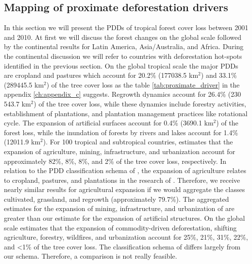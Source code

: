 		\subsection{Mapping of proximate deforestation drivers}
		\label{subsec:results_proxy_deforestation_drivers}
			In this section we will present the \acp{PDD} of tropical forest cover loss between 2001 and 2010. At first we will discuss the forest changes on the global scale followed by the continental results for Latin America, Asia/Australia, and Africa. During the continental discussion we will refer to countries with deforestation hot-spots identified in the previous section. On the global tropical scale the major \acp{PDD} are cropland and pastures which account for 20.2\% (177038.5 km$^2$) and 33.1\% (289445.5 km$^2$) of the tree cover loss as the table \ref{tab:proximate_driver} in the appendix \ref{ch:appendix_c} suggests. Regrowth dynamics account for 26.4\% (230 543.7 km$^2$) of the tree cover loss, while these dynamics include forestry activities, establishment of plantations, and plantation management practices like rotational cycle. The expansion of artificial surfaces account for 0.4\% (3690.1 km$^2$) of the forest loss, while the inundation of forests by rivers and lakes account for 1.4\% (12011.9 km$^2$). For 100 tropical and subtropical countries, \citet{Hosonuma2012} estimates that the expansion of agriculture, mining, infrastructure, and urbanization account for approximately 82\%, 8\%, 8\%, and 2\% of the tree cover loss, respectively. In relation to the \ac{PDD} classification schema of \citet{Geist2001}, the expansion of agriculture relates to cropland, pastures, and plantations in the research of \citeauthor{Hosonuma2012}. Therefore, we receive nearly similar results for agricultural expansion if we would aggregate the classes cultivated, grassland, and regrowth (approximately 79.7\%). The aggregated estimates for the expansion of mining, infrastructure, and urbanization of \citeauthor{Hosonuma2012} are greater than our estimate for the expansion of artificial structures. On the global scale \citet{Curtis2018} estimates that the expansion of commodity-driven deforestation, shifting agriculture, forestry, wildfires, and urbanization account for 25\%, 21\%, 31\%, 22\%, and <1\% of the tree cover loss. The classification schema of \citeauthor{Curtis2018} differs largely from our schema. Therefore, a comparison is not really feasible. 

